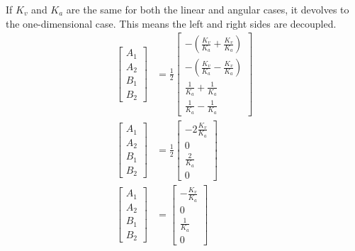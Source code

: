 If $K_v$ and $K_a$ are the same for both the linear and angular cases, it devolves to the one-dimensional case. This means the left and right sides are decoupled.
\begin{align*}
  \begin{bmatrix}
    A_1 \\
    A_2 \\
    B_1 \\
    B_2
  \end{bmatrix} &= \frac{1}{2}
  \begin{bmatrix}
    -\left(\frac{K_v}{K_a} + \frac{K_v}{K_a}\right) \\
    -\left(\frac{K_v}{K_a} - \frac{K_v}{K_a}\right) \\
    \frac{1}{K_a} + \frac{1}{K_a} \\
    \frac{1}{K_a} - \frac{1}{K_a}
  \end{bmatrix} \\
  \begin{bmatrix}
    A_1 \\
    A_2 \\
    B_1 \\
    B_2
  \end{bmatrix} &= \frac{1}{2}
  \begin{bmatrix}
    -2\frac{K_v}{K_a} \\
    0 \\
    \frac{2}{K_a} \\
    0
  \end{bmatrix} \\
  \begin{bmatrix}
    A_1 \\
    A_2 \\
    B_1 \\
    B_2
  \end{bmatrix} &=
  \begin{bmatrix}
    -\frac{K_v}{K_a} \\
    0 \\
    \frac{1}{K_a} \\
    0
  \end{bmatrix}
\end{align*}
